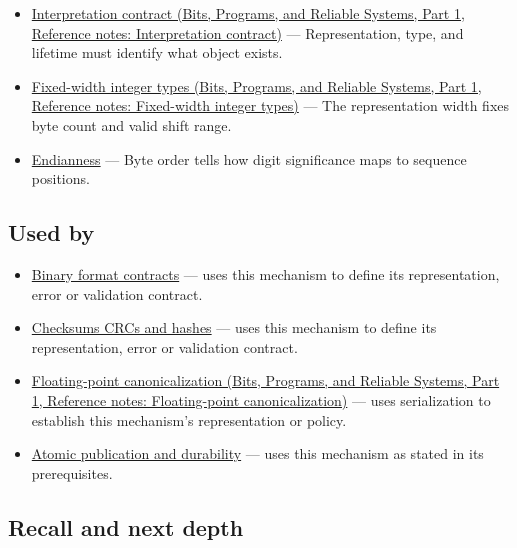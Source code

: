\hypertarget{appendix-91d09ebed979-prerequisites}{}

\begin{itemize}
\tightlist
\item
  \href{../01-Bits-Programs-and-Reliable-Systems-P01/main.pdf\#appendix-f414bd4ed05c}{Interpretation contract (Bits, Programs, and Reliable Systems, Part 1, Reference notes: Interpretation contract)} --- Representation, type, and lifetime must identify what object exists.
\item
  \href{../01-Bits-Programs-and-Reliable-Systems-P01/main.pdf\#appendix-cc04044b5782}{Fixed-width integer types (Bits, Programs, and Reliable Systems, Part 1, Reference notes: Fixed-width integer types)} --- The representation width fixes byte count and valid shift range.
\item
  \hyperref[appendix-bc07c3d25b18]{Endianness} --- Byte order tells how digit significance maps to sequence positions.
\end{itemize}

\subsection{Used by}\label{appendix-91d09ebed979-used-by}

\hypertarget{appendix-91d09ebed979-used-by}{}

\begin{itemize}
\item
  \hyperref[appendix-590bbb2424c1]{Binary format contracts} --- uses this mechanism to define its representation, error or validation contract.
\item
  \hyperref[appendix-ed338677de0a]{Checksums CRCs and hashes} --- uses this mechanism to define its representation, error or validation contract.
\item
  \href{../01-Bits-Programs-and-Reliable-Systems-P01/main.pdf\#appendix-e90053a4b201}{Floating-point canonicalization (Bits, Programs, and Reliable Systems, Part 1, Reference notes: Floating-point canonicalization)} --- uses serialization to establish this mechanism's representation or policy.
\item
  \hyperref[appendix-e89a8f290ef5]{Atomic publication and durability} --- uses this mechanism as stated in its prerequisites.
\end{itemize}

\subsection{Recall and next depth}\label{appendix-91d09ebed979-recall-and-next-depth}

